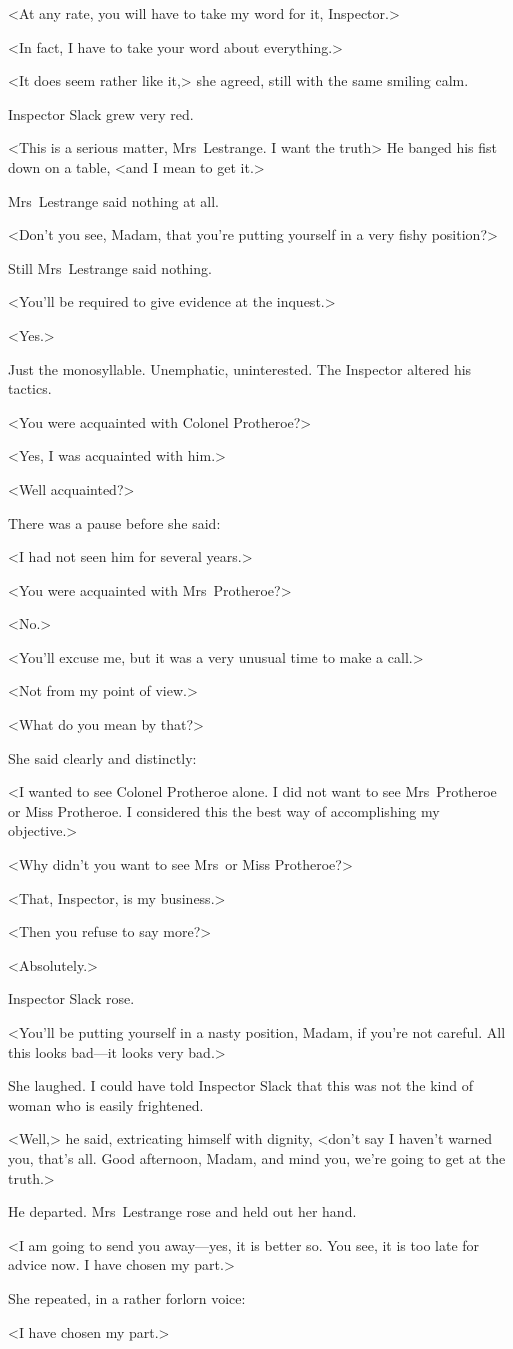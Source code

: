 <At any rate, you will have to take my word for it, Inspector.>

<In fact, I have to take your word about everything.>

<It does seem rather like it,> she agreed, still with the same smiling calm.

Inspector Slack grew very red.

<This is a serious matter, Mrs~Lestrange. I want the truth\longdash> He banged his fist down on a table, <and I mean to get it.>

Mrs~Lestrange said nothing at all.

<Don't you see, Madam, that you're putting yourself in a very fishy position?>

Still Mrs~Lestrange said nothing.

<You'll be required to give evidence at the inquest.>

<Yes.>

Just the monosyllable. Unemphatic, uninterested. The Inspector altered his tactics.

<You were acquainted with Colonel Protheroe?>

<Yes, I was acquainted with him.>

<Well acquainted?>

There was a pause before she said:

<I had not seen him for several years.>

<You were acquainted with Mrs~Protheroe?>

<No.>

<You'll excuse me, but it was a very unusual time to make a call.>

<Not from my point of view.>

<What do you mean by that?>

She said clearly and distinctly:

<I wanted to see Colonel Protheroe alone. I did not want to see Mrs~Protheroe or Miss Protheroe. I considered this the best way of accomplishing my objective.>

<Why didn't you want to see Mrs~or Miss Protheroe?>

<That, Inspector, is my business.>

<Then you refuse to say more?>

<Absolutely.>

Inspector Slack rose.

<You'll be putting yourself in a nasty position, Madam, if you're not careful. All this looks bad—it looks very bad.>

She laughed. I could have told Inspector Slack that this was not the kind of woman who is easily frightened.

<Well,> he said, extricating himself with dignity, <don't say I haven't warned you, that's all. Good afternoon, Madam, and mind you, we're going to get at the truth.>

He departed. Mrs~Lestrange rose and held out her hand.

<I am going to send you away—yes, it is better so. You see, it is too late for advice now. I have chosen my part.>

She repeated, in a rather forlorn voice:

<I have chosen my part.>